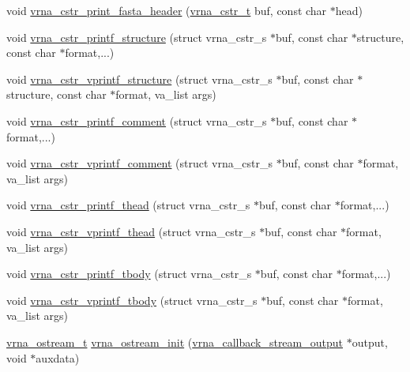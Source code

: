 \begin{DoxyCompactItemize}
\item 
void \mbox{\hyperlink{group__buffer__utils_ga0a320b027c942dc85c508788272dd861}{vrna\+\_\+cstr\+\_\+print\+\_\+fasta\+\_\+header}} (\mbox{\hyperlink{group__buffer__utils_ga445bbbcfca238a956bbc11862892adc8}{vrna\+\_\+cstr\+\_\+t}} buf, const char $\ast$head)
\item 
void \mbox{\hyperlink{group__buffer__utils_ga29af50810807da04d6a244f8801728f9}{vrna\+\_\+cstr\+\_\+printf\+\_\+structure}} (struct vrna\+\_\+cstr\+\_\+s $\ast$buf, const char $\ast$structure, const char $\ast$format,...)
\item 
void \mbox{\hyperlink{group__buffer__utils_gad4cd97b8943fdb83652cb6b46d91bb44}{vrna\+\_\+cstr\+\_\+vprintf\+\_\+structure}} (struct vrna\+\_\+cstr\+\_\+s $\ast$buf, const char $\ast$structure, const char $\ast$format, va\+\_\+list args)
\item 
void \mbox{\hyperlink{group__buffer__utils_ga31409fdd5c038ee488bdf1ffcc630253}{vrna\+\_\+cstr\+\_\+printf\+\_\+comment}} (struct vrna\+\_\+cstr\+\_\+s $\ast$buf, const char $\ast$format,...)
\item 
void \mbox{\hyperlink{group__buffer__utils_ga9824160bbe620784fcca5f10c4ff247c}{vrna\+\_\+cstr\+\_\+vprintf\+\_\+comment}} (struct vrna\+\_\+cstr\+\_\+s $\ast$buf, const char $\ast$format, va\+\_\+list args)
\item 
void \mbox{\hyperlink{group__buffer__utils_gae5e551ba77b488a728d7e1700ecb0df8}{vrna\+\_\+cstr\+\_\+printf\+\_\+thead}} (struct vrna\+\_\+cstr\+\_\+s $\ast$buf, const char $\ast$format,...)
\item 
void \mbox{\hyperlink{group__buffer__utils_ga6455c968e6190156267d5afdb8f211a0}{vrna\+\_\+cstr\+\_\+vprintf\+\_\+thead}} (struct vrna\+\_\+cstr\+\_\+s $\ast$buf, const char $\ast$format, va\+\_\+list args)
\item 
void \mbox{\hyperlink{group__buffer__utils_ga525e2673039eb2967cfcb118281ece3c}{vrna\+\_\+cstr\+\_\+printf\+\_\+tbody}} (struct vrna\+\_\+cstr\+\_\+s $\ast$buf, const char $\ast$format,...)
\item 
void \mbox{\hyperlink{group__buffer__utils_gab10cb243cdf925c41d6d84a5a1df9760}{vrna\+\_\+cstr\+\_\+vprintf\+\_\+tbody}} (struct vrna\+\_\+cstr\+\_\+s $\ast$buf, const char $\ast$format, va\+\_\+list args)
\item 
\mbox{\hyperlink{group__buffer__utils_ga8da189552af21ab6e4e88bdcc240870c}{vrna\+\_\+ostream\+\_\+t}} \mbox{\hyperlink{group__buffer__utils_gad23113e66a0910ec2341856e2da56bf6}{vrna\+\_\+ostream\+\_\+init}} (\mbox{\hyperlink{group__buffer__utils_ga4adb94338a6f0a1a451e03c1bdac0d9d}{vrna\+\_\+callback\+\_\+stream\+\_\+output}} $\ast$output, void $\ast$auxdata)

\end{DoxyCompactItemize}
